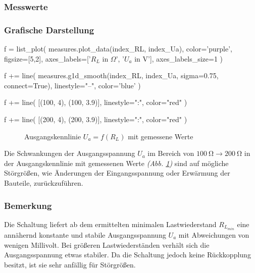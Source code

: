 \documentclass[a4paper]{hitec}
\begin{document}
\subsubsection{Messwerte}

\begin{center}
    \renewcommand{\arraystretch}{1.2}
\end{center}

\subsubsection{Grafische Darstellung}

\begin{sagesilent}
    f = list_plot(
        measures.plot_data(index_RL, index_Ua),
        color='purple',
        figsize=[5,2],
        axes_labels=['$R_L$ in $\Omega$', '$U_a$ in V'],
        axes_labels_size=1
    )

    f += line(
        measures.g1d_smooth(index_RL, index_Ua, sigma=0.75, connect=True),
        linestyle="--",
        color='blue'
    )

    f += line(
        [(100, 4), (100, 3.9)],
        linestyle=":",
        color="red"
    )

    f += line(
        [(200, 4), (200, 3.9)],
        linestyle=":",
        color="red"
    )
\end{sagesilent}

\begin{figure}[H]
    \centering
    \caption{Ausgangskennlinie \textbf{$U_{a} = f(R_L)$} mit gemessene Werte}
    \label{fig:measure1}
\end{figure}

Die Schwankungen der Ausgangsspannung $U_{a}$ im Bereich von $\qty{100}{\ohm} \to \qty{200}{\ohm}$ in der Ausgangskennlinie mit gemessenen Werte \textit{(Abb. \ref{fig:measure1})} sind auf mögliche Störgrößen, wie Änderungen der Eingangsspannung oder Erwärmung der Bauteile, zurückzuführen.

\subsubsection{Bemerkung}

Die Schaltung liefert ab dem ermittelten minimalen Lastwiederstand $R_{L_{min}}$ eine annähernd konstante und stabile Ausgangsspannung $U_{a}$ mit Abweichungen von wenigen Millivolt.
Bei größeren Lastwiederständen verhält sich die Ausgangsspannung etwas stabiler.
Da die Schaltung jedoch keine Rückkopplung besitzt, ist sie sehr anfällig für Störgrößen.
\end{document}
